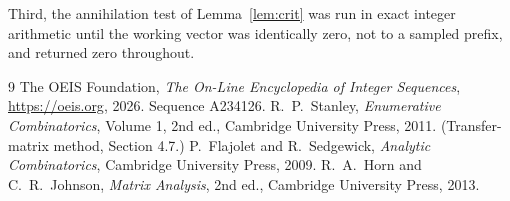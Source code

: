 \documentclass[11pt,a4paper]{article}
\theoremstyle{plain}
\theoremstyle{definition}
\begin{document}
Third, the annihilation test of Lemma~\ref{lem:crit} was run in exact integer arithmetic
until the working vector was identically zero, not to a sampled prefix, and returned zero
throughout.

\begin{thebibliography}{9}
 The OEIS Foundation, \emph{The On-Line Encyclopedia of Integer
Sequences}, \url{https://oeis.org}, 2026. Sequence A234126.
 R.~P.~Stanley, \emph{Enumerative Combinatorics}, Volume 1, 2nd ed.,
Cambridge University Press, 2011. (Transfer-matrix method, Section 4.7.)
 P.~Flajolet and R.~Sedgewick, \emph{Analytic Combinatorics}, Cambridge
University Press, 2009.
 R.~A.~Horn and C.~R.~Johnson, \emph{Matrix Analysis}, 2nd ed., Cambridge
University Press, 2013.
\end{thebibliography}
\end{document}
